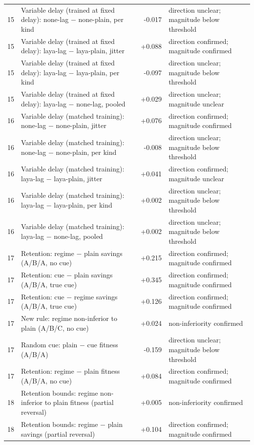 \begin{table}[t]
\begin{tabular}{@{}lp{}rp{}@{}}
15 & Variable delay (trained at fixed delay): none-lag $-$ none-plain, per kind & -0.017 & direction unclear; magnitude below threshold \\
15 & Variable delay (trained at fixed delay): laya-lag $-$ laya-plain, jitter & +0.088 & direction confirmed; magnitude confirmed \\
15 & Variable delay (trained at fixed delay): laya-lag $-$ laya-plain, per kind & -0.097 & direction unclear; magnitude below threshold \\
15 & Variable delay (trained at fixed delay): laya-lag $-$ none-lag, pooled & +0.029 & direction unclear; magnitude unclear \\
16 & Variable delay (matched training): none-lag $-$ none-plain, jitter & +0.076 & direction confirmed; magnitude confirmed \\
16 & Variable delay (matched training): none-lag $-$ none-plain, per kind & -0.008 & direction unclear; magnitude below threshold \\
16 & Variable delay (matched training): laya-lag $-$ laya-plain, jitter & +0.041 & direction confirmed; magnitude unclear \\
16 & Variable delay (matched training): laya-lag $-$ laya-plain, per kind & +0.002 & direction unclear; magnitude below threshold \\
16 & Variable delay (matched training): laya-lag $-$ none-lag, pooled & +0.002 & direction unclear; magnitude below threshold \\
17 & Retention: regime $-$ plain savings (A/B/A, no cue) & +0.215 & direction confirmed; magnitude confirmed \\
17 & Retention: cue $-$ plain savings (A/B/A, true cue) & +0.345 & direction confirmed; magnitude confirmed \\
17 & Retention: cue $-$ regime savings (A/B/A, true cue) & +0.126 & direction confirmed; magnitude confirmed \\
17 & New rule: regime non-inferior to plain (A/B/C, no cue) & +0.024 & non-inferiority confirmed \\
17 & Random cue: plain $-$ cue fitness (A/B/A) & -0.159 & direction unclear; magnitude below threshold \\
17 & Retention: regime $-$ plain fitness (A/B/A, no cue) & +0.084 & direction confirmed; magnitude confirmed \\
18 & Retention bounds: regime non-inferior to plain fitness (partial reversal) & +0.005 & non-inferiority confirmed \\
18 & Retention bounds: regime $-$ plain savings (partial reversal) & +0.104 & direction confirmed; magnitude confirmed \\

\end{tabular}
\end{table}
